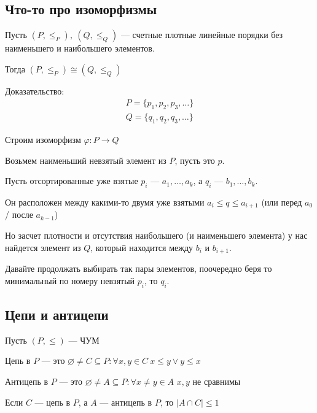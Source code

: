 \subsection{Что-то про изоморфизмы}

\begin{thrm}{}{}
    Пусть \( (P, \leq_P), \ (Q, \leq_Q) \) --- счетные плотные линейные порядки без наименьшего и наибольшего элементов.

    Тогда \( (P, \leq_P) \cong (Q, \leq_Q) \)
\end{thrm}

Доказательство:
\begin{gather*}
    P = \{ p_1, p_2, p_3, \ldots \}
    \\
    Q = \{ q_1, q_2, q_3, \ldots \}
\end{gather*}

Строим изоморфизм \( \varphi : P \to Q \)

Возьмем наименьший невзятый элемент из \( P \), пусть это \( p \).

Пусть отсортированные уже взятые \( p_i \) --- \( a_1, \ldots, a_k \),
а \( q_i \) --- \( b_1, \ldots, b_k \).

Он расположен между какими-то двумя уже взятыми \( a_i \leq q \leq a_{i + 1} \) (или перед \( a_0 \) / после \( a_{k - 1} \))

Но засчет плотности и отсутствия наибольшего (и наименьшего элемента) у нас найдется элемент из \( Q \),
который находится между \( b_i \) и \( b_{i + 1} \).

Давайте продолжать выбирать так пары элементов, поочередно беря то минимальный по номеру невзятый \( p_i \), то \( q_i \).

\subsection{Цепи и антицепи}

Пусть \( (P, \leq) \) --- ЧУМ

\begin{defn}{}{}
    Цепь в \( P \) --- это \( \varnothing \neq C \subseteq P : \forall x, y \in C \ x \leq y \lor y \leq x \)

    Антицепь в \( P \) --- это \( \varnothing \neq A \subseteq P : \forall x \neq y \in A \) \( x, y \) не сравнимы
\end{defn}

\begin{exercise}{}{}
    Если \( C \) --- цепь в \( P \), а \( A \) --- антицепь в \( P \), то \( | A \cap C | \leq 1 \)
\end{exercise}

